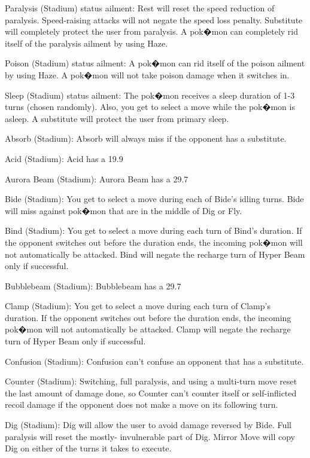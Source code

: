 \documentclass[reprint, aps, prl, paper=A4]{revtex4-1}
\begin{document}
Paralysis (Stadium) status ailment:
Rest will reset the speed reduction of paralysis. Speed-raising attacks will not negate the
speed loss penalty. Substitute will completely protect the user from paralysis. A pok�mon can
completely rid itself of the paralysis ailment by using Haze.

Poison (Stadium) status ailment:
A pok�mon can rid itself of the poison ailment by using Haze. A pok�mon will not take poison
damage when it switches in.

Sleep (Stadium) status ailment:
The pok�mon receives a sleep duration of 1-3 turns (chosen randomly). Also, you get to select a
move while the pok�mon is asleep. A substitute will protect the user from primary sleep.

Absorb (Stadium):
Absorb will always miss if the opponent has a substitute.

Acid (Stadium):
Acid has a 19.9%

Aurora Beam (Stadium):
Aurora Beam has a 29.7%

Bide (Stadium):
You get to select a move during each of Bide's idling turns. Bide will miss against pok�mon
that are in the middle of Dig or Fly.

Bind (Stadium):
You get to select a move during each turn of Bind's duration. If the opponent switches out
before the duration ends, the incoming pok�mon will not automatically be attacked. Bind will
negate the recharge turn of Hyper Beam only if successful.

Bubblebeam (Stadium):
Bubblebeam has a 29.7%

Clamp (Stadium):
You get to select a move during each turn of Clamp's duration. If the opponent switches out
before the duration ends, the incoming pok�mon will not automatically be attacked. Clamp will
negate the recharge turn of Hyper Beam only if successful.

Confusion (Stadium):
Confusion can't confuse an opponent that has a substitute.

Counter (Stadium):
Switching, full paralysis, and using a multi-turn move reset the last amount of damage done, so
Counter can't counter itself or self-inflicted recoil damage if the opponent does not make a
move on its following turn.

Dig (Stadium):
Dig will allow the user to avoid damage reversed by Bide. Full paralysis will reset the mostly-
invulnerable part of Dig. Mirror Move will copy Dig on either of the turns it takes to execute.
\end{document}
